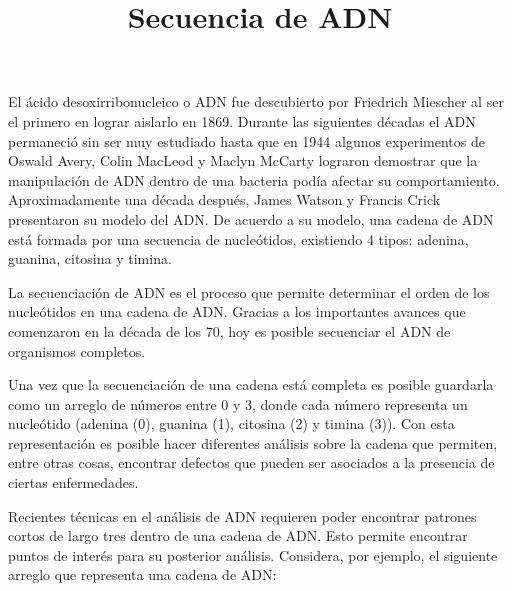 \documentclass{oci}
\title{Secuencia de ADN}
\begin{document}
\begin{problemDescription}
  El ácido desoxirribonucleico o ADN fue descubierto por Friedrich Miescher
  al ser el primero en lograr aislarlo en 1869.
  Durante las siguientes décadas el ADN permaneció sin ser muy estudiado hasta que
  en 1944 algunos experimentos de Oswald Avery, Colin MacLeod y Maclyn McCarty lograron
  demostrar que la manipulación de ADN dentro de una bacteria podía afectar su comportamiento.
  Aproximadamente una década después, James Watson y Francis Crick presentaron su modelo del ADN.
  De acuerdo a su modelo, una cadena de ADN está formada por una secuencia
  de nucleótidos, existiendo 4 tipos: adenina, guanina, citosina y timina.

  La secuenciación de ADN es el proceso que permite determinar el orden de los
  nucleótidos en una cadena de ADN.
  Gracias a los importantes avances que comenzaron en la década de los 70, hoy
  es posible secuenciar el ADN de organismos completos.

  Una vez que la secuenciación de una cadena está completa es posible 
  guardarla como un arreglo de números entre 0 y 3, donde cada número
  representa un nucleótido (adenina (0), guanina (1), citosina (2) y timina (3)).
  Con esta representación es posible hacer diferentes análisis sobre la cadena que
  permiten, entre otras cosas, encontrar defectos que pueden ser asociados a la
  presencia de ciertas enfermedades.

  Recientes técnicas en el análisis de ADN requieren poder encontrar patrones
  cortos de largo tres dentro de una cadena de ADN.
  Esto permite encontrar puntos de interés para su posterior análisis.
  Considera, por ejemplo, el siguiente arreglo que representa una cadena de ADN:

  \begin{center}
  \end{center}


\end{problemDescription}
\end{document}
